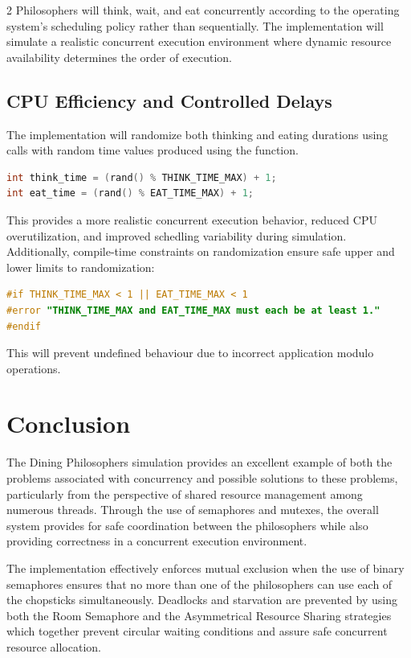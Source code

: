 \documentclass[11pt,a4paper]{article}
\newcommand{\code}[1]{\tcbox[on line, boxsep=1pt, left=1pt, right=1pt, top=1pt, bottom=1pt, colback=inlinegray, colframe=inlinegray, fontupper=\ttfamily\small]{#1}}
\begin{document}
\begin{multicols*}{2}
Philosophers will think, wait, and eat concurrently according to the operating system's scheduling policy rather than sequentially. The implementation will simulate a realistic concurrent execution environment where dynamic resource availability determines the order of execution.

\subsection{CPU Efficiency and Controlled Delays}
The implementation will randomize both thinking and eating durations using \code{sleep()} calls with random time values produced using the \code{rand()} function.

\begin{lstlisting}[language=C, caption=Randomized Execution Times]
int think_time = (rand() % THINK_TIME_MAX) + 1;
int eat_time = (rand() % EAT_TIME_MAX) + 1;
\end{lstlisting}

This provides a more realistic concurrent execution behavior, reduced CPU overutilization, and improved schedling variability during simulation. Additionally, compile-time constraints on randomization ensure safe upper and lower limits to randomization:

\begin{lstlisting}[language=C, caption=Compile-time Safety Checks]
#if THINK_TIME_MAX < 1 || EAT_TIME_MAX < 1
#error "THINK_TIME_MAX and EAT_TIME_MAX must each be at least 1."
#endif
\end{lstlisting}

This will prevent undefined behaviour due to incorrect application modulo operations.

\section{Conclusion}
The Dining Philosophers simulation provides an excellent example of both the problems associated with concurrency and possible solutions to these problems, particularly from the perspective of shared resource management among numerous threads. Through the use of semaphores and mutexes, the overall system provides for safe coordination between the philosophers while also providing correctness in a concurrent execution environment.

The implementation effectively enforces mutual exclusion when the use of binary semaphores ensures that no more than one of the philosophers can use each of the chopsticks simultaneously. Deadlocks and starvation are prevented by using both the Room Semaphore and the Asymmetrical Resource Sharing strategies which together prevent circular waiting conditions and assure safe concurrent resource allocation.


\end{multicols*}
\end{document}
